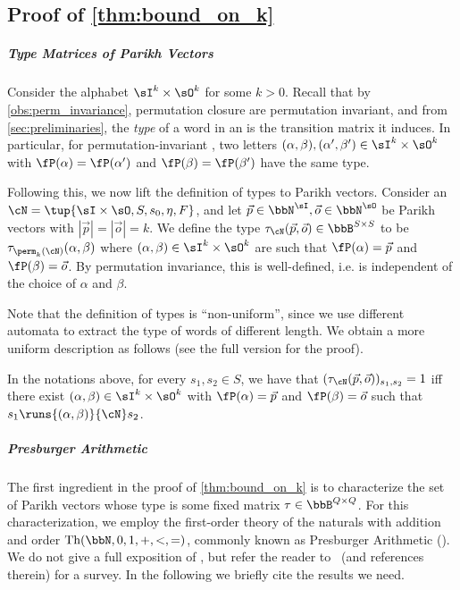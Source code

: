 \subsection{Proof of \cref{thm:bound_on_k}}
\label{sec:proof_of_bound}
\subparagraph*{Type Matrices of Parikh Vectors}
Consider the alphabet $\sI^k\times \sO^k$ for some $k>0$.
Recall that by \cref{obs:perm_invariance}, permutation closure \NFAs are permutation invariant, and from \cref{sec:preliminaries}, the \emph{type} of a word in an \NFA is the transition matrix it induces.
In particular, for permutation-invariant \NFAs, two letters $(\alpha,\beta),(\alpha',\beta')\in \sI^k\times \sO^k$ with $\fP(\alpha)=\fP(\alpha')$ and $\fP(\beta)=\fP(\beta')$ have the same type.

Following this, we now lift the definition of types to Parikh vectors. Consider an \NFA $\cN=\tup{\sI\times \sO,S,s_0,\eta,F}$, and let $\vec{p}\in \bbN^{\sI},\vec{o}\in \bbN^{\sO}$ be Parikh vectors with $|\vec{p}|=|\vec{o}|=k$. We define the type $\tau_\cN(\vec{p},\vec{o})\in \bbB^{S\times S}$ to be $\tau_{\perm_k(\cN)}(\alpha,\beta)$ where $(\alpha,\beta)\in \sI^k\times \sO^k$ are such that $\fP(\alpha)=\vec{p}$ and $\fP(\beta)=\vec{o}$. By permutation invariance, this is well-defined, i.e. is independent of the choice of $\alpha$ and $\beta$.

Note that the definition of types is ``non-uniform'', since we use different automata to extract the type of words of different length. We obtain a more uniform description as follows (see the full version for the proof).
\begin{lemma}
	\label{lem:type_of_parikh}
	In the notations above, for every $s_1,s_2\in S$, we have that $(\tau_{\cN}(\vec{p},\vec{o}))_{s_1,s_2}=1$ iff there exist $(\alpha,\beta)\in \sI^k\times \sO^k$ with $\fP(\alpha)=\vec{p}$ and $\fP(\beta)=\vec{o}$ such that $s_1\runs{(\alpha,\beta)}{\cN}s_2$.
	\end{lemma}

\subparagraph*{Presburger Arithmetic}
The first ingredient in the proof of \cref{thm:bound_on_k} is to characterize the set of Parikh vectors whose type is some fixed matrix $\tau\in \bbB^{Q\times Q}$. For this characterization, we employ the first-order theory of the naturals with addition and order $\textrm{Th}(\bbN,0,1,+,<,=)$, commonly known as Presburger Arithmetic (\PA). We do not give a full exposition of \PA, but refer the reader to~\cite{Haase2018} (and references therein) for a survey. In the following we briefly cite the results we need.

